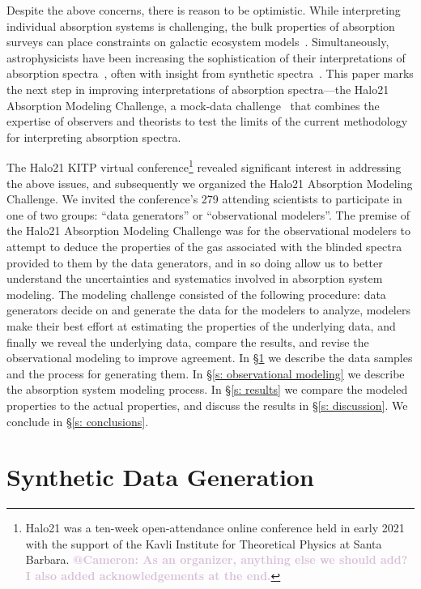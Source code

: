 \documentclass[fleqn,usenatbib]{mnras}
\makeatletter
\newcommand{\atcameron}[1]{\textcolor{Thistle}{\textbf{@Cameron: #1}}}
\makeatother
\begin{document}
Despite the above concerns, there is reason to be optimistic.
While interpreting individual absorption systems is challenging, the bulk properties of absorption surveys can place constraints on galactic ecosystem models~\citep[e.g.][]{Sorini2018, Lan2018}.
Simultaneously, astrophysicists have been increasing the sophistication of their interpretations of absorption spectra~\citep[e.g.][]{Churchill2015, Sameer2021}, often with insight from synthetic spectra~\citep[e.g.][]{Hummels2013, Liang2018}.
This paper marks the next step in improving interpretations of absorption spectra---the Halo21 Absorption Modeling Challenge, a mock-data challenge~\citep[e.g.][]{Regimbau2012, Meacher2015, Hazboun2019} that combines the expertise of observers and theorists to test the limits of the current methodology for interpreting absorption spectra.

The Halo21 KITP virtual conference\footnote{Halo21 was a ten-week open-attendance online conference held in early 2021 with the support of the Kavli Institute for Theoretical Physics at Santa Barbara. \atcameron{As an organizer, anything else we should add? I also added acknowledgements at the end.}} revealed significant interest in addressing the above issues, and subsequently we organized the Halo21 Absorption Modeling Challenge.
We invited the conference's 279 attending scientists to participate in one of two groups: ``data generators'' or ``observational modelers''.
The premise of the Halo21 Absorption Modeling Challenge was for the observational modelers to attempt to deduce the properties of the gas associated with the blinded spectra provided to them by the data generators, and in so doing allow us to better understand the uncertainties and systematics involved in absorption system modeling.
The modeling challenge consisted of the following procedure:
data generators decide on and generate the data for the modelers to analyze, modelers make their best effort at estimating the properties of the underlying data, and finally we reveal the underlying data, compare the results, and revise the observational modeling to improve agreement.
In \S\ref{s: data generation} we describe the data samples and the process for generating them.
In \S\ref{s: observational modeling} we describe the absorption system modeling process.
In \S\ref{s: results} we compare the modeled properties to the actual properties, and discuss the results in \S\ref{s: discussion}.
We conclude in \S\ref{s: conclusions}.

\section{Synthetic Data Generation}
\label{s: data generation}
\end{document}

